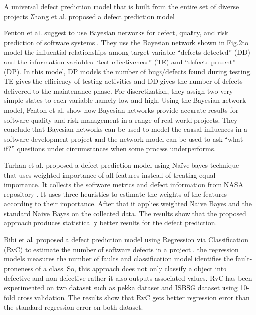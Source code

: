 \documentclass[12pt]{report}
\begin{document}
A universal defect prediction model that is built from the entire set of diverse projects Zhang et al. proposed a defect prediction model 

Fenton et al. suggest to use Bayesian networks for defect, quality, and risk prediction of software systems \cite{fenton2002software}. They use the Bayesian network shown in Fig.2to model the influential relationships among target variable “defects detected” (DD) and the information variables “test effectiveness” (TE) and “defects present” (DP). In this model, DP models the number of bugs/defects found during testing. TE gives the efficiency of testing activities and DD gives the number of defects delivered to the maintenance phase. For discretization, they assign two very simple states to each variable namely low and high. Using the Bayesian network model, Fenton et al. show how Bayesian networks provide accurate results for software quality and risk management in a range of real world projects. They conclude that Bayesian networks can be used to model the causal influences in a software development project and the network model can be used to ask “what if?” questions under circumstances when
some process underperforms.

Turhan et al. proposed a defect prediction model using Naïve bayes technique that uses weighted importance of all features instead of treating equal importance\cite{turhan2007software}. It collects the software metrics and defect information from NASA repository \cite{nasa2007respository}. It uses three heuristics to estimate the weights of the features according to their importance. After that it applies weighted Naive Bayes and the standard Naive Bayes on the collected data. The results show that the proposed approach produces statistically better results for the defect prediction.  

Bibi et al. proposed a defect prediction model using Regression via Classification (RvC) to estimate the number of software defects in a project \cite{bibi2006software,bibi2008regression}. the regression models measures the number of faults and classification model identifies the fault-proneness of a class. So, this approach does not only classify a object into defective and non-defective rather it also outputs associated values. RvC has been experimented on two dataset such as pekka dataset and ISBSG dataset \cite{isbsg} using 10-fold cross validation. The results show that RvC gets better regression error than the standard regression error on both dataset.    
\end{document}
